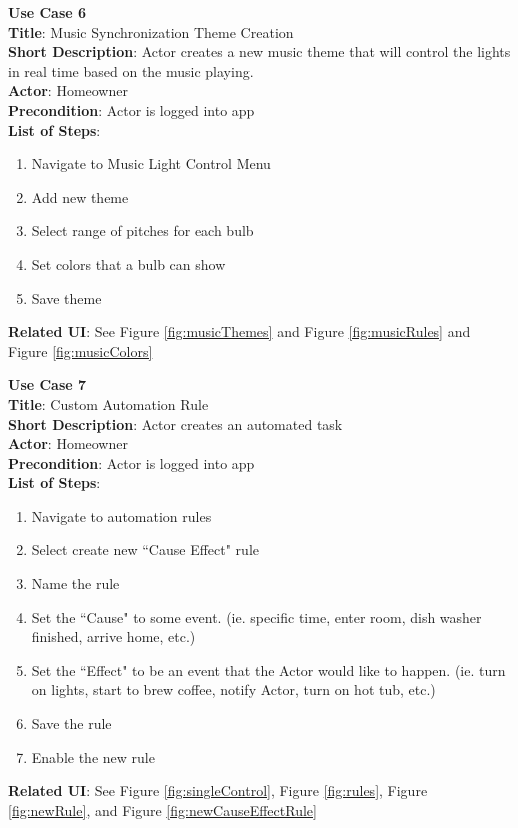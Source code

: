 \documentclass[12pt]{article}
\begin{document}
\begin{samepage}
  \begin{framed}
    \textbf{Use Case 6} \\
    \textbf{Title}: Music Synchronization Theme Creation \\
    \textbf{Short Description}:  Actor creates a new music theme that will control the lights in real time based on the music playing. \\
    \textbf{Actor}: Homeowner \\
    \textbf{Precondition}: Actor is logged into app \\
    \textbf{List of Steps}: 
    \begin{enumerate}
        \item Navigate to Music Light Control Menu
        \item Add new theme
        \item Select range of pitches for each bulb
        \item Set colors that a bulb can show
        \item Save theme
    \end{enumerate}
    \textbf{Related UI}:  See Figure \ref{fig:musicThemes} and Figure \ref{fig:musicRules} and Figure \ref{fig:musicColors} 
  \end{framed}
\end{samepage}

\begin{samepage}
  \begin{framed}
    \textbf{Use Case 7} \\
    \textbf{Title}: Custom Automation Rule \\
    \textbf{Short Description}: Actor creates an automated task \\
    \textbf{Actor}: Homeowner \\
    \textbf{Precondition}: Actor is logged into app \\
    \textbf{List of Steps}:
    \begin{enumerate}
        \item Navigate to automation rules
        \item Select create new ``Cause Effect" rule
        \item Name the rule
        \item Set the ``Cause" to some event. (ie. specific time, enter room, dish washer finished, arrive home, etc.)
        \item Set the ``Effect" to be an event that the Actor would like to happen. (ie. turn on lights, start to brew coffee, notify Actor, turn on hot tub, etc.)
        \item Save the rule
        \item Enable the new rule
    \end{enumerate}
    \textbf{Related UI}:  See Figure \ref{fig:singleControl}, Figure \ref{fig:rules}, Figure \ref{fig:newRule}, and Figure \ref{fig:newCauseEffectRule}
  \end{framed}
\end{samepage}
\end{document}
